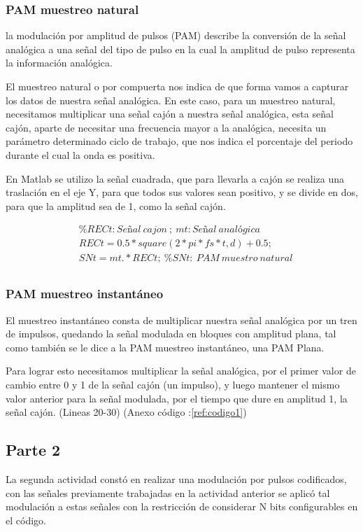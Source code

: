 \subsubsection{PAM muestreo natural}
la modulación por amplitud de pulsos (PAM) describe la conversión de la señal analógica a una señal del tipo de pulso en la cual la amplitud de pulso representa la información analógica.\cite{PAM:Couch}

El muestreo natural o por compuerta nos indica de que forma vamos a capturar los datos de nuestra señal analógica. En este caso, para un muestreo natural, necesitamos multiplicar una señal cajón a nuestra señal analógica, esta señal cajón, aparte de necesitar una frecuencia mayor a la analógica, necesita un parámetro determinado ciclo de trabajo, que nos indica el porcentaje del periodo durante el cual la onda es positiva.

En Matlab se utilizo la señal cuadrada, que para llevarla a cajón se realiza una traslación en el eje Y, para que todos sus valores sean positivo, y se divide en dos, para que la amplitud sea de 1, como la señal cajón.

\begin{equation} \label{eq:PAM_muestreo_natural}
\begin{split} 
&\%RECt:Señal\ cajon\ ;\ mt:Señal\ analógica \\
&RECt=0.5*square(2* pi* fs*t,d)+0.5;    \\
&SNt=mt.*RECt; \ \%SNt :\ PAM\ muestro\ natural \\
\end{split}
\end{equation}



\subsubsection{PAM muestreo instantáneo}
El muestreo instantáneo consta de multiplicar nuestra señal analógica por un tren de impulsos, quedando la señal modulada en bloques con amplitud plana, tal como también se le dice a la PAM muestreo instantáneo, una PAM Plana.

Para lograr esto necesitamos multiplicar la señal analógica, por el primer valor de cambio entre 0 y 1 de la señal cajón (un impulso), y luego mantener el mismo valor anterior para la señal modulada, por el tiempo que dure en amplitud 1, la señal cajón. (Lineas 20-30) (Anexo código :\ref{ref:codigo1})

\subsection{Parte 2}
La segunda actividad constó en realizar una modulación por pulsos codificados, con las señales previamente trabajadas en la actividad anterior se aplicó tal modulación a estas señales con la restricción de considerar N bits configurables en el código.

